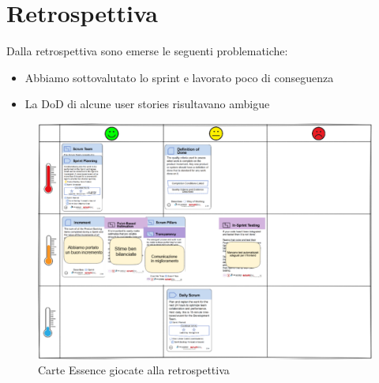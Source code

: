 \documentclass[11pt]{article}
\begin{document}
\newpage
\section*{Retrospettiva}
Dalla retrospettiva sono emerse le seguenti problematiche:
\begin{itemize}
    \item Abbiamo sottovalutato lo sprint e lavorato poco di conseguenza
    \item La DoD di alcune user stories risultavano ambigue
\end{itemize}
\begin{figure}[H]
    \centering
    \includegraphics[width=12cm]{./img/retrospettiva.png}
    \caption{Carte Essence giocate alla retrospettiva}
\end{figure}
\end{document}
